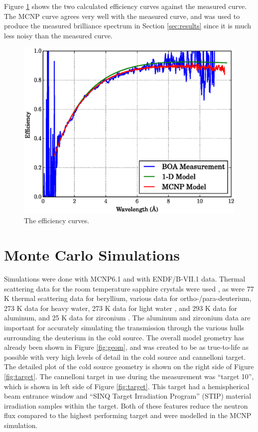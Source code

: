 \documentclass[5p,12pt]{elsarticle}
\begin{document}
Figure \ref{fig:eff} shows the two calculated efficiency curves against the measured curve.  The MCNP curve agrees very well with the measured curve, and was used to produce the measured brilliance spectrum in Section \ref{sec:results} since it is much less noisy than the measured curve.

\begin{figure}[h!] 
  \centering
    \includegraphics[width=\columnwidth]{graphics/eff.eps}
     \caption{The efficiency curves. \label{fig:eff} }
\end{figure}


\section{Monte Carlo Simulations}
\label{sec:sim}

Simulations were done with MCNP6.1 and with ENDF/B-VII.1 data.  Thermal scattering data for the room temperature sapphire crystals were used \cite{sapp}, as were 77 K thermal scattering data for beryllium, various data for ortho-/para-deuterium, 273 K data for heavy water, 273 K data for light water \cite{mcnp6}, and 293 K data for aluminum, and 25 K data for zirconium \cite{IKE}.  The aluminum and zirconium data are important for accurately simulating the transmission through the various hulls surrounding the deuterium in the cold source.  The overall model geometry has already been shown in Figure \ref{fig:geom}, and was created to be as true-to-life as possible with very high levels of detail in the cold source and cannelloni target.  The detailed plot of the cold source geometry is shown on the right side of Figure \ref{fig:target}.  The cannelloni target in use during the measurement was ``target 10'', which is shown in left side of Figure \ref{fig:target}. This target had a hemispherical beam entrance window and ``SINQ Target Irradiation Program'' (STIP) material irradiation samples within the target.  Both of these features reduce the neutron flux compared to the highest performing target and were modelled in the MCNP simulation.
\end{document}
